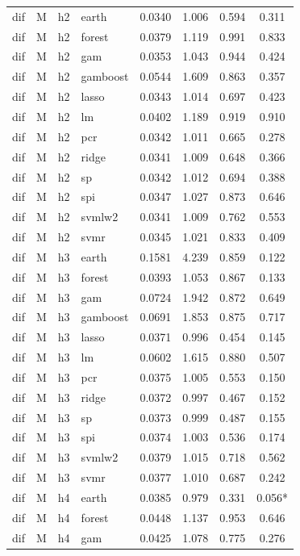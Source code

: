 \begin{ThreePartTable}
\begin{longtable}[t]{llclcccc}
\addlinespace
dif & M & h2 & earth & 0.0340 & 1.006 & 0.594 & 0.311\\
dif & M & h2 & forest & 0.0379 & 1.119 & 0.991 & 0.833\\
dif & M & h2 & gam & 0.0353 & 1.043 & 0.944 & 0.424\\
dif & M & h2 & gamboost & 0.0544 & 1.609 & 0.863 & 0.357\\
dif & M & h2 & lasso & 0.0343 & 1.014 & 0.697 & 0.423\\
dif & M & h2 & lm & 0.0402 & 1.189 & 0.919 & 0.910\\
dif & M & h2 & pcr & 0.0342 & 1.011 & 0.665 & 0.278\\
dif & M & h2 & ridge & 0.0341 & 1.009 & 0.648 & 0.366\\
dif & M & h2 & sp & 0.0342 & 1.012 & 0.694 & 0.388\\
dif & M & h2 & spi & 0.0347 & 1.027 & 0.873 & 0.646\\
dif & M & h2 & svmlw2 & 0.0341 & 1.009 & 0.762 & 0.553\\
dif & M & h2 & svmr & 0.0345 & 1.021 & 0.833 & 0.409\\
\addlinespace
dif & M & h3 & earth & 0.1581 & 4.239 & 0.859 & 0.122\\
dif & M & h3 & forest & 0.0393 & 1.053 & 0.867 & 0.133\\
dif & M & h3 & gam & 0.0724 & 1.942 & 0.872 & 0.649\\
dif & M & h3 & gamboost & 0.0691 & 1.853 & 0.875 & 0.717\\
dif & M & h3 & lasso & 0.0371 & 0.996 & 0.454 & 0.145\\
dif & M & h3 & lm & 0.0602 & 1.615 & 0.880 & 0.507\\
dif & M & h3 & pcr & 0.0375 & 1.005 & 0.553 & 0.150\\
dif & M & h3 & ridge & 0.0372 & 0.997 & 0.467 & 0.152\\
dif & M & h3 & sp & 0.0373 & 0.999 & 0.487 & 0.155\\
dif & M & h3 & spi & 0.0374 & 1.003 & 0.536 & 0.174\\
dif & M & h3 & svmlw2 & 0.0379 & 1.015 & 0.718 & 0.562\\
dif & M & h3 & svmr & 0.0377 & 1.010 & 0.687 & 0.242\\
\addlinespace
dif & M & h4 & earth & 0.0385 & 0.979 & 0.331 & 0.056*\\
dif & M & h4 & forest & 0.0448 & 1.137 & 0.953 & 0.646\\
dif & M & h4 & gam & 0.0425 & 1.078 & 0.775 & 0.276\\

\end{longtable}
\end{ThreePartTable}
